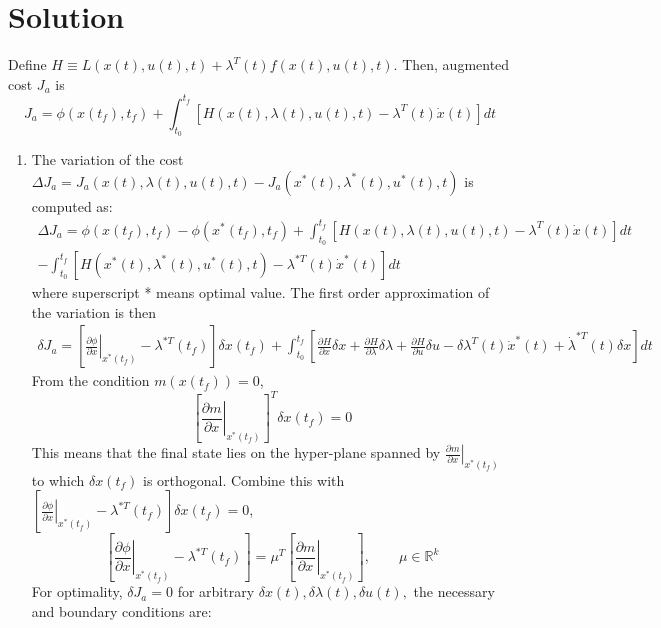 \documentclass[10pt,a4paper,oneside]{article}
\begin{document}
\section* {Solution} 
Define $H \equiv L(x(t), u(t), t)+\lambda^{T}(t) f(x(t), u(t), t) .$ Then, augmented cost $J_{a}$ is
\[
J_{a}=\phi\left(x\left(t_{f}\right), t_{f}\right)+\int_{t_{0}}^{t_{f}}\left[H(x(t), \lambda(t), u(t), t)-\lambda^{T}(t) \dot{x}(t)\right] d t
\]
\begin{enumerate}
\item The variation of the cost $\Delta J_{a}=J_{a}(x(t), \lambda(t), u(t), t)-J_{a}\left(x^{*}(t), \lambda^{*}(t), u^{*}(t), t\right)$ is computed as:
\[
\begin{array}{c}{\Delta J_{a}=\phi\left(x\left(t_{f}\right), t_{f}\right)-\phi\left(x^{*}\left(t_{f}\right), t_{f}\right)+\int_{t_{0}}^{t_{f}}\left[H(x(t), \lambda(t), u(t), t)-\lambda^{T}(t) \dot{x}(t)\right] d t} \\ {-\int_{t_{0}}^{t_{f}}\left[H\left(x^{*}(t), \lambda^{*}(t), u^{*}(t), t\right)-\lambda^{* T}(t) \dot{x}^{*}(t)\right] d t}\end{array}
\]
where superscript * means optimal value. The first order approximation of the variation is then
\[
\begin{split}
\delta J_{a}=\left[\left.\frac{\partial \phi}{\partial x}\right|_{x^{*}\left(t_{f}\right)}-\lambda^{* T}\left(t_{f}\right)\right] \delta x\left(t_{f}\right)+ \int_{t_{0}}^{t_{f}}\left[\frac{\partial H}{\partial x} \delta x+\frac{\partial H}{\partial \lambda} \delta \lambda+\frac{\partial H}{\partial u} \delta u-\delta \lambda^{T}(t) \dot{x}^{*}(t)+\dot{\lambda}^{* T}(t) \delta x\right] d t\end{split}
\]
From the condition $m\left(x\left(t_{f}\right)\right)=0$,
\[
\left[\left.\frac{\partial m}{\partial x}\right|_{x^{*}\left(t_{f}\right)}\right]^{T} \delta x\left(t_{f}\right)=0
\]
This means that the final state lies on the hyper-plane spanned by $\left.\frac{\partial m}{\partial x}\right|_{x^{*}\left(t_{f}\right)}$ to which $\delta x\left(t_{f}\right)$ is orthogonal. Combine this with $\left[\left.\frac{\partial \phi}{\partial x}\right|_{x^{*}\left(t_{f}\right)}-\lambda^{* T}\left(t_{f}\right)\right] \delta x\left(t_{f}\right)=0$,
\[
\left[\left.\frac{\partial \phi}{\partial x}\right|_{x^{*}\left(t_{f}\right)}-\lambda^{* T}\left(t_{f}\right)\right]=\mu^{T}\left[\left.\frac{\partial m}{\partial x}\right|_{x^{*}\left(t_{f}\right)}\right], \qquad \mu \in \mathbb{R}^{k}
\]
For optimality, $\delta J_{a}=0$ for arbitrary $\delta x(t), \delta \lambda(t), \delta u(t),$ the necessary and boundary conditions are:

\end{enumerate}
\end{document}
